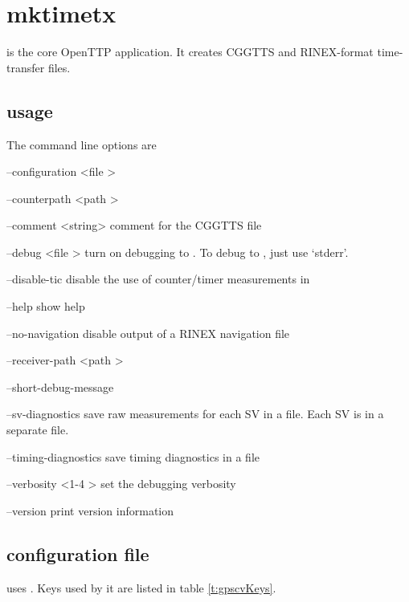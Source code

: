 
\section{mktimetx}

\hypertarget{h:mktimetx}{}

 is the core OpenTTP application.
It creates CGGTTS and RINEX-format time-transfer files.

\subsection{usage}

The command line options are
\begin{description*}
	\item[--configuration \textless file \textgreater] 
	\item[--counterpath \textless path \textgreater]	
	\item[--comment \textless string>] comment for the CGGTTS file	
	\item[--debug \textless file \textgreater]	turn on debugging to . To debug to , just use `stderr'.
	\item[--disable-tic] disable the use of counter/timer measurements in 
	\item[--help] show help
	\item[--no-navigation] disable output of a RINEX navigation file
	\item[--receiver-path \textless path \textgreater]
	\item[--short-debug-message]
	\item[--sv-diagnostics] save raw measurements for each SV in a file. Each SV is in a separate file.
	\item[--timing-diagnostics] save timing diagnostics in a file
	\item[--verbosity \textless 1-4 \textgreater] set the debugging verbosity
	\item[--version] print version information	
\end{description*}

\subsection{configuration file}

 uses .
Keys used by it are listed in table \ref{t:gpscvKeys}.

